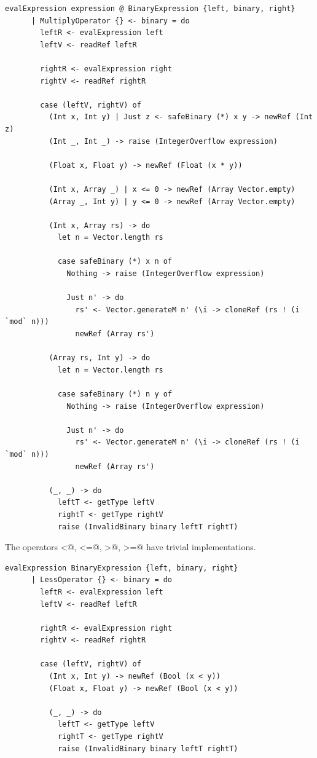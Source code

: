\documentclass[UdineBachThesis,american,11pt,draft]{PhdThesis}
\begin{document}
  \begin{lstlisting}[gobble=4,basicstyle=\ttfamily\small]
    evalExpression expression @ BinaryExpression {left, binary, right}
      | MultiplyOperator {} <- binary = do
        leftR <- evalExpression left
        leftV <- readRef leftR

        rightR <- evalExpression right
        rightV <- readRef rightR

        case (leftV, rightV) of
          (Int x, Int y) | Just z <- safeBinary (*) x y -> newRef (Int z)
          (Int _, Int _) -> raise (IntegerOverflow expression)

          (Float x, Float y) -> newRef (Float (x * y))

          (Int x, Array _) | x <= 0 -> newRef (Array Vector.empty)
          (Array _, Int y) | y <= 0 -> newRef (Array Vector.empty)

          (Int x, Array rs) -> do
            let n = Vector.length rs

            case safeBinary (*) x n of
              Nothing -> raise (IntegerOverflow expression)

              Just n' -> do
                rs' <- Vector.generateM n' (\i -> cloneRef (rs ! (i `mod` n)))
                newRef (Array rs')

          (Array rs, Int y) -> do
            let n = Vector.length rs

            case safeBinary (*) n y of
              Nothing -> raise (IntegerOverflow expression)

              Just n' -> do
                rs' <- Vector.generateM n' (\i -> cloneRef (rs ! (i `mod` n)))
                newRef (Array rs')

          (_, _) -> do
            leftT <- getType leftV
            rightT <- getType rightV
            raise (InvalidBinary binary leftT rightT)
  \end{lstlisting}

  The operators \lstinline@<@, \lstinline@<=@, \lstinline@>@, \lstinline@>=@
  have trivial implementations.

  \begin{lstlisting}[gobble=4,basicstyle=\ttfamily\small]
    evalExpression BinaryExpression {left, binary, right}
      | LessOperator {} <- binary = do
        leftR <- evalExpression left
        leftV <- readRef leftR

        rightR <- evalExpression right
        rightV <- readRef rightR

        case (leftV, rightV) of
          (Int x, Int y) -> newRef (Bool (x < y))
          (Float x, Float y) -> newRef (Bool (x < y))

          (_, _) -> do
            leftT <- getType leftV
            rightT <- getType rightV
            raise (InvalidBinary binary leftT rightT)
  \end{lstlisting}
\end{document}
